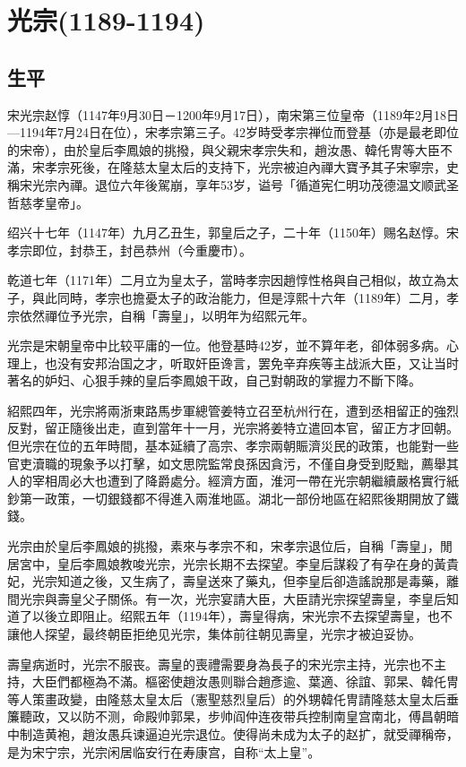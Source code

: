 
\section{光宗\tiny(1189-1194)}

\subsection{生平}

宋光宗赵惇（1147年9月30日－1200年9月17日），南宋第三位皇帝（1189年2月18日—1194年7月24日在位），宋孝宗第三子。42岁時受孝宗禅位而登基（亦是最老即位的宋帝），由於皇后李鳳娘的挑撥，與父親宋孝宗失和，趙汝愚、韓仛冑等大臣不滿，宋孝宗死後，在隆慈太皇太后的支持下，光宗被迫內禪大寶予其子宋寧宗，史稱宋光宗內禪。退位六年後駕崩，享年53岁，谥号「循道宪仁明功茂德温文顺武圣哲慈孝皇帝」。

绍兴十七年（1147年）九月乙丑生，郭皇后之子，二十年（1150年）赐名赵惇。宋孝宗即位，封恭王，封邑恭州（今重慶市）。

乾道七年（1171年）二月立为皇太子，當時孝宗因趙惇性格與自己相似，故立為太子，與此同時，孝宗也擔憂太子的政治能力，但是淳熙十六年（1189年）二月，孝宗依然禪位予光宗，自稱「壽皇」，以明年为绍熙元年。

光宗是宋朝皇帝中比较平庸的一位。他登基時42岁，並不算年老，卻体弱多病。心理上，也没有安邦治国之才，听取奸臣谗言，罢免辛弃疾等主战派大臣，又让当时著名的妒妇、心狠手辣的皇后李鳳娘干政，自己對朝政的掌握力不斷下降。

紹熙四年，光宗將兩浙東路馬步軍總管姜特立召至杭州行在，遭到丞相留正的強烈反對，留正隨後出走，直到當年十一月，光宗將姜特立遣回本官，留正方才回朝。但光宗在位的五年時間，基本延續了高宗、孝宗兩朝賑濟災民的政策，也能對一些官吏瀆職的現象予以打擊，如文思院監常良孫因貪污，不僅自身受到貶黜，薦舉其人的宰相周必大也遭到了降爵處分。經濟方面，淮河一帶在光宗朝繼續嚴格實行紙鈔第一政策，一切銀錢都不得進入兩淮地區。湖北一部份地區在紹熙後期開放了鐵錢。

光宗由於皇后李鳳娘的挑撥，素來与孝宗不和，宋孝宗退位后，自稱「壽皇」，閒居宮中，皇后李鳳娘教唆光宗，光宗长期不去探望。李皇后謀殺了有孕在身的黃貴妃，光宗知道之後，又生病了，壽皇送來了藥丸，但李皇后卻造謠說那是毒藥，離間光宗與壽皇父子關係。有一次，光宗宴請大臣，大臣請光宗探望壽皇，李皇后知道了以後立即阻止。绍熙五年（1194年），壽皇得病，宋光宗不去探望壽皇，也不讓他人探望，最终朝臣拒绝见光宗，集体前往朝见壽皇，光宗才被迫妥协。

壽皇病逝时，光宗不服丧。壽皇的喪禮需要身為長子的宋光宗主持，光宗也不主持，大臣們都極為不滿。樞密使趙汝愚则聯合趙彥逾、葉適、徐誼、郭杲、韓仛冑等人策畫政變，由隆慈太皇太后（憲聖慈烈皇后）的外甥韓仛冑請隆慈太皇太后垂簾聽政，又以防不测，命殿帅郭杲，步帅阎仲连夜带兵控制南皇宫南北，傅昌朝暗中制造黄袍，趙汝愚兵谏逼迫光宗退位。使得尚未成为太子的赵扩，就受禪稱帝，是为宋宁宗，光宗闲居临安行在寿康宫，自称“太上皇”。

